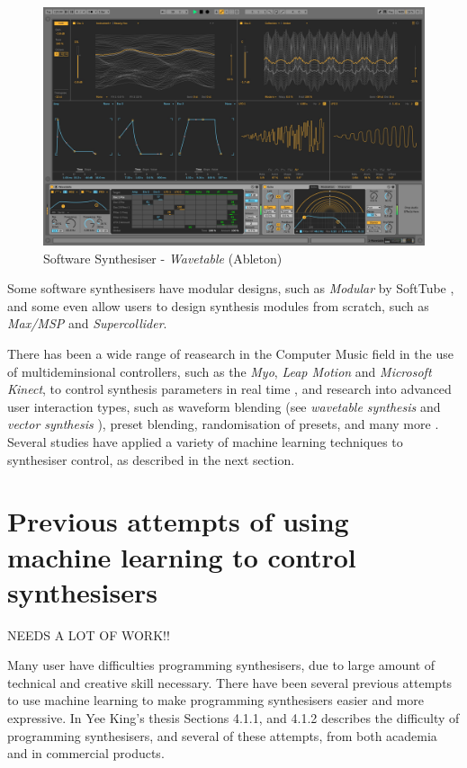\documentclass[11pt, oneside]{report}   	%
\begin{document}
\begin{figure}[h] 
	\centering
	\includegraphics[width = 5in]{AbletonWavetable.jpg}
	\caption{Software Synthesiser - \emph{Wavetable} (Ableton)\cite{Wavetable} }
	\label{fig:AbletonWavetable}
\end{figure}

Some software synthesisers have modular designs, such as \emph{Modular} by SoftTube \cite{SoftTube}, and some even allow users to design synthesis modules from scratch, such as \emph{Max/MSP} and \emph{Supercollider}.

There has been a wide range of reasearch in the Computer Music field in the use of multideminsional controllers, such as the  \emph{Myo}, \emph{Leap Motion} and \emph{Microsoft Kinect}, to control synthesis parameters in real time \cite{ICMC, TubbThesis}, and research into advanced user interaction types, such as waveform blending (see \emph{wavetable synthesis}\cite{Wavetable} and \emph{vector synthesis} \cite{SY22}), preset blending, randomisation of presets, and many more \cite{YeeKing, EvolvedAudioEffects}.  Several studies have applied a variety of machine learning techniques to synthesiser control, as described in the next section.

\section{Previous attempts of using machine learning to control synthesisers}
NEEDS A LOT OF WORK!!

Many user have difficulties programming synthesisers, due to large amount of technical and creative skill necessary. There have been several previous attempts to use machine learning to make programming synthesisers easier and more expressive. In Yee King's thesis \cite{YeeKing} Sections 4.1.1, and 4.1.2 describes the difficulty of programming synthesisers, and several of these attempts, from both academia and in commercial products.
\end{document}
